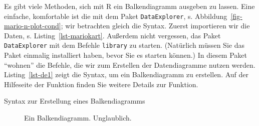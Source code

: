 \documentclass[
  letterpaper,
]{scrbook}
\newenvironment{Shaded}{\begin{snugshade}}{\end{snugshade}}
\newcommand{\FunctionTok}[1]{\textcolor[rgb]{0.28,0.35,0.67}{#1}}
\newcommand{\NormalTok}[1]{\textcolor[rgb]{0.00,0.23,0.31}{#1}}
\newcommand{\OtherTok}[1]{\textcolor[rgb]{0.00,0.23,0.31}{#1}}
\newcommand{\SpecialCharTok}[1]{\textcolor[rgb]{0.37,0.37,0.37}{#1}}
\theoremstyle{definition}
\theoremstyle{definition}
\theoremstyle{definition}
\theoremstyle{remark}
\begin{document}
Es gibt viele Methoden, sich mit R ein Balkendiagramm ausgeben zu
lassen. Eine einfache, komfortable ist die mit dem Paket
\texttt{DataExplorer}, s. Abbildung~\ref{fig-mario-n-plot-cond}; wir
betrachten gleich die Syntax. Zuerst importieren wir die Daten, s.
Listing~\ref{lst-mariokart}. Außerdem nicht vergessen, das Paket
\texttt{DataExplorer} mit dem Befehle \texttt{library} zu starten.
(Natürlich müssen Sie das Paket einmalig installiert haben, bevor Sie es
starten können.) In diesem Paket \enquote{wohnen} die Befehle, die wir
zum Erstellen der Datendiagramme nutzen werden. Listing~\ref{lst-de1}
zeigt die Syntax, um ein Balkendiagramm zu erstellen. Auf der Hilfeseite
der Funktion finden Sie weitere Details zur Funktion.

\begin{codelisting}

\caption{\label{lst-de1}Syntax zur Erstellung eines Balkendiagramms}

\centering{

\begin{Shaded}
\begin{Highlighting}[]
\FunctionTok{library}\NormalTok{(DataExplorer)}
\NormalTok{mariokart }\OtherTok{\textless{}{-}} \FunctionTok{read.csv}\NormalTok{(mariokart\_path)}

\NormalTok{mariokart }\SpecialCharTok{\%\textgreater{}\%} 
  \FunctionTok{select}\NormalTok{(cond) }\SpecialCharTok{\%\textgreater{}\%} 
  \FunctionTok{plot\_bar}\NormalTok{()}
\end{Highlighting}
\end{Shaded}

}

\end{codelisting}%

\begin{figure}[H]


\caption{\label{fig-de1}Ein Balkendiagramm. Unglaublich.}

\end{figure}%
\end{document}
